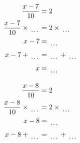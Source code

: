 \documentclass[12pt]{article}
\newcounter{minipagecount}
\begin{document}
\begin{multicols}{2}
\begin{minipage}[t]{0.45\textwidth}
    \raggedright %
    \begin{align*} %
        \frac{x - 7}{10} &= 2\\
        \frac{x - 7}{10} \times\dotuline{\hspace{5mm}} &= 2 \times\dotuline{\hspace{5mm}}\\
        x - 7 &= \dotuline{\hspace{5mm}}\\
        x - 7 + \dotuline{\hspace{5mm}} &= \dotuline{\hspace{5mm}} + \dotuline{\hspace{5mm}}\\
        x &= \dotuline{\hspace{5mm}}\\
    \end{align*}
\end{minipage} %
\noindent{(\theminipagecount)}\hspace{0.1mm} %
\begin{minipage}[t]{0.45\textwidth} %
    \vspace{-26pt}  %
    \raggedright %
    \begin{align*} %
        \frac{x - 8}{10} &= 2\\
        \frac{x - 8}{10} \times\dotuline{\hspace{5mm}} &= 2 \times\dotuline{\hspace{5mm}}\\
        x - 8 &= \dotuline{\hspace{5mm}}\\
        x - 8 + \dotuline{\hspace{5mm}} &= \dotuline{\hspace{5mm}} + \dotuline{\hspace{5mm}}\\

\end{align*}
\end{minipage}
\end{multicols}
\end{document}
